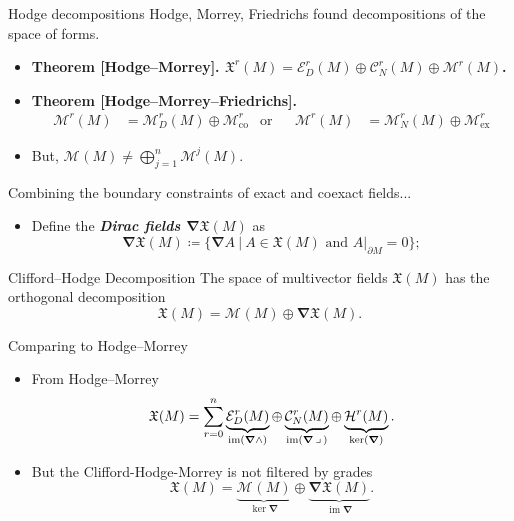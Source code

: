 \documentclass[aspectratio=169,handout]{beamer}
\newcommand\boldgreen[1]{\textcolor{lighter_csu_green}{\emph{\textbf{#1}}}}
\newcommand\boldgold[1]{\textcolor{csu_gold}{\textbf{#1}}}
\newcommand{\im}{\operatorname{im}}
\newcommand{\grad}{\boldsymbol{\nabla}}
\newcommand{\monogenics}{\mathcal{M}}
\newcommand{\boundary}{{\partial M}}
\newcommand{\contract}{\hspace*{.5mm} \lrcorner \hspace*{.5mm}}
\newcommand{\monogenicfields}[1]{\mathcal{M}^{#1}(M)}
\newcommand{\smoothfields}{\mathfrak{X}}
\begin{document}
\begin{frame}{Hodge decompositions}
\vfill
Hodge, Morrey, Friedrichs found decompositions of the space of forms.
\begin{itemize}
  \pause
  \item \boldgold{Theorem [Hodge--Morrey]. $\smoothfields^r(M) = \mathcal{E}_D^r(M) \oplus \mathcal{C}_N^r(M) \oplus \monogenics^r(M)$.}
  \pause
  \item \boldgold{Theorem [Hodge--Morrey--Friedrichs].
  \begin{align*}
  \monogenics^r(M) &= \monogenics^r_D(M) \oplus \monogenics^r_{\textrm{co}} &\textrm{or} && \monogenics^r(M) &= \monogenics^r_N(M) \oplus \monogenics^r_{\textrm{ex}}
  \end{align*}
  }
  \pause
  \item \textcolor{dull_red}{But, $\monogenicfields{} \neq \bigoplus_{j=1}^n \monogenicfields{j}$.}
\end{itemize}
\vfill
\end{frame}

\begin{frame}{}
\vfill
Combining the boundary constraints of exact and coexact fields...
\begin{itemize}
  \pause
  \item Define the \boldgreen{Dirac fields $\grad \smoothfields(M)$} as
  \[
      \grad \smoothfields(M) \coloneqq \{ \grad A ~\vert~ A \in \smoothfields(M) \textrm{~and~} A\vert_\boundary = 0\};
  \]
\end{itemize}
\pause
\begin{thm*}{Clifford--Hodge Decomposition}{}
The space of multivector fields $\smoothfields(M)$ has the orthogonal decomposition
\[
\smoothfields(M) = \monogenicfields{} \oplus \grad \smoothfields(M).
\]
\end{thm*}
\vfill
\end{frame}


\begin{frame}{Comparing to Hodge--Morrey}
\vfill
\begin{itemize}
\pause
\item From Hodge--Morrey
\[
\smoothfields(M) = \sum_{r=0}^n \underbrace{\mathcal{E}_D^r(M)}_{\operatorname{im}(\grad \wedge)} \oplus \underbrace{\mathcal{C}_N^r(M)}_{\operatorname{im}(\grad \contract)} \oplus \underbrace{\mathcal{H}^r(M)}_{\operatorname{ker}(\grad)}.
\]
\pause
\item But the Clifford-Hodge-Morrey is not filtered by grades
\[
\smoothfields(M) = \underbrace{\monogenicfields{}}_{\ker \grad} \oplus \underbrace{\grad \smoothfields(M)}_{\im \grad}.
\]
\end{itemize}
\vfill
\end{frame}
\end{document}
